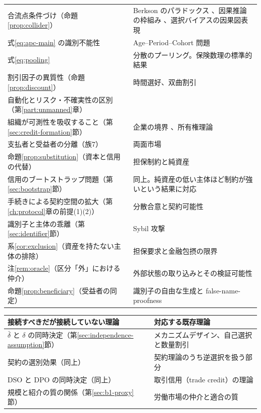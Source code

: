 \begin{longtable}{@{}>{\raggedright\arraybackslash}p{}>{\raggedright\arraybackslash}p{}@{}}
合流点条件づけ（命題\ref{prop:collider}） & Berkson のパラドックス \cite{berkson1946}、因果推論の枠組み \cite{pearl2009}、選択バイアスの因果図表現 \cite{hernan2004} \\
式\eqref{eq:apc-main} の識別不能性 & Age--Period--Cohort 問題 \cite{mason1985} \\
式\eqref{eq:pooling} & 分散のプーリング。保険数理の標準的結果 \\
割引因子の異質性（命題\ref{prop:discount}） & 時間選好、双曲割引 \cite{laibson1997} \\
自動化とリスク・不確実性の区別（第\ref{part:unmanned}章） & \cite{knight1921} \\
組織が可測性を吸収すること（第\ref{sec:credit-formation}節） & 企業の境界 \cite{coase1937}、所有権理論 \cite{grossman1986} \\
支払者と受益者の分離（族7） & 両面市場 \cite{rochet2003} \\
命題\ref{prop:substitution}（資本と信用の代替） & 担保制約と純資産 \cite{kiyotaki1997,rampini2010,rampini2013} \\
信用のブートストラップ問題（第\ref{sec:bootstrap}節） & 同上。純資産の低い主体ほど制約が強いという結果に対応 \\
手続きによる契約空間の拡大（第\ref{ch:protocol}章の前提(1)(2)） & 分散合意と契約可能性 \cite{cong2019} \\
識別子と主体の乖離（第\ref{sec:identifier}節） & Sybil 攻撃 \cite{douceur2002} \\
系\ref{cor:exclusion}（資産を持たない主体の排除） & 担保要求と金融包摂の限界 \cite{oecd2024} \\
注\ref{rem:oracle}（区分「外」における仲介） & 外部状態の取り込みとその検証可能性 \cite{pasdar2023} \\
命題\ref{prop:beneficiary}（受益者の同定） & 識別子の自由な生成と false-name-proofness \cite{yokoo2004} \\
\end{longtable}

\begin{center}
\begin{tabularx}{\textwidth}{@{}XX@{}}
\toprule
接続すべきだが接続していない理論 & 対応する既存理論 \\
\midrule
$\bar\delta$ と $\delta$ の同時決定（第\ref{sec:independence-assumption}節） & メカニズムデザイン、自己選択と数量割引 \\
契約の選別効果（同上） & 契約理論のうち逆選択を扱う部分 \\
DSO と DPO の同時決定（同上） & 取引信用（trade credit）の理論 \\
規模と紹介の質の関係（第\ref{sec:b1-proxy}節） & 労働市場の仲介と適合の質 \\
\bottomrule
\end{tabularx}
\label{tab:priorwork-layer3b}
\end{center}

